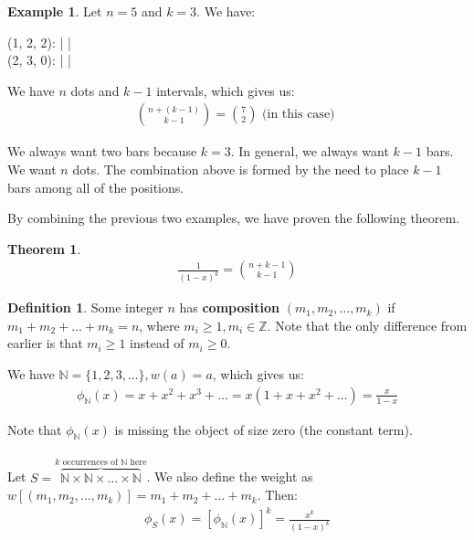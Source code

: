 \documentclass[]{article}
\newtheorem{theorem}{Theorem}[section]
\theoremstyle{definition}
\newtheorem{defn}{Definition}[section]
\newtheorem{ex}{Example}[section]
\begin{document}
				\begin{ex}
					Let $n = 5$ and $k = 3$. We have:

					\begin{center}
						(1, 2, 2): \textbullet{} | \textbullet{} \textbullet{} | \textbullet{} \textbullet{} \\
						(2, 3, 0): \textbullet{} \textbullet{} | \textbullet{} \textbullet{} \textbullet{} |
					\end{center}

					We have $n$ dots and $k-1$ intervals, which gives us:
					\begin{align*}
						{n + (k - 1) \choose k - 1} = {7 \choose 2} \text{ (in this case) }
					\end{align*}

					We always want two bars because $k = 3$. In general, we always want $k - 1$ bars. We want $n$ dots. The combination above is formed by the need to place $k - 1$ bars among all of the positions.
				\end{ex}
				By combining the previous two examples, we have proven the following theorem.
				\begin{theorem}
					\begin{align*}
						[x^n] \frac{1}{(1 - x)^k} = {n + k - 1 \choose k - 1}
					\end{align*}
				\end{theorem}

				\begin{defn}
					Some integer $n$ has \textbf{composition} $(m_1, m_2, \ldots, m_k)$ if $m_1 + m_2 + \ldots + m_k = n$, where $m_i \ge 1, m_i \in \mathbb{Z}$. Note that the only difference from earlier is that $m_i \ge 1$ instead of $m_i \ge 0$.
				\end{defn}

				We have $\mathbb{N} = \{1, 2, 3, \ldots \}, w(a) = a$, which gives us:
				\begin{align*}
					\phi_{\mathbb{N}}(x) = x + x^2 + x^3 + \ldots = x(1 + x + x^2 + \ldots) = \frac{x}{1 - x}
				\end{align*}

				Note that $\phi_{\mathbb{N}}(x)$ is missing the object of size zero (the constant term).
				\\ \\
				Let $S = \overbrace{\mathbb{N} \times \mathbb{N} \times \ldots \times \mathbb{N}}^{k \text{ occurrences of } \mathbb{N} \text{ here}}$. We also define the weight as $w[(m_1, m_2, \ldots, m_k)] = m_1 + m_2 + \ldots + m_k$. Then:
				\begin{align*}
					\phi_S(x) = [\phi_{\mathbb{N}}(x)]^k = \frac{x^k}{(1 - x)^k}
				\end{align*}
\end{document}
